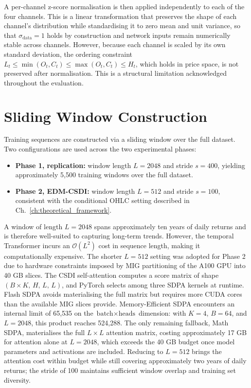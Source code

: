 A per-channel z-score normalisation is then applied independently to each of the four
channels. This is a linear transformation that preserves the shape of each channel's
distribution while standardising it to zero mean and unit variance, so that
\(\sigma_{\text{data}} = 1\) holds by construction and network inputs remain numerically
stable across channels. However, because each channel is scaled by its own standard
deviation, the ordering constraint \(L_t \leq \min(O_t, C_t) \leq \max(O_t, C_t) \leq H_t\),
which holds in price space, is not preserved after normalisation. This is a structural
limitation acknowledged throughout the evaluation.

\section{Sliding Window Construction}

Training sequences are constructed via a sliding window over the full dataset. Two
configurations are used across the two experimental phases:
\begin{itemize}
    \item \textbf{Phase 1, replication:} window length \(L = 2048\) and stride \(s = 400\),
    yielding approximately 5,500 training windows over the full dataset.
    \item \textbf{Phase 2, EDM-CSDI:} window length \(L = 512\) and stride \(s = 100\),
    consistent with the conditional OHLC setting described in
    Ch.~\ref{ch:theoretical_framework}.
\end{itemize}

A window of length \(L = 2048\) spans approximately ten years of daily returns and is
therefore well-suited to capturing long-term trends. However, the temporal Transformer
incurs an \(\mathcal{O}(L^2)\) cost in sequence length, making it computationally
expensive. The shorter \(L = 512\) setting was adopted for Phase 2 due to hardware
constraints imposed by MIG partitioning of the A100 GPU into 40 GB slices. The CSDI
self-attention computes a score matrix of shape \((B \times K,\, H,\, L,\, L)\), and
PyTorch selects among three SDPA kernels at runtime. Flash SDPA avoids materialising
the full matrix but requires more CUDA cores than the available MIG slices provide.
Memory-Efficient SDPA encounters an internal limit of 65,535 on the
\(\text{batch} \times \text{heads}\) dimension: with \(K = 4\), \(B = 64\), and
\(L = 2048\), this product reaches 524,288. The only remaining fallback, Math SDPA,
materialises the full \(L \times L\) attention matrix, costing approximately 17 GB for
attention alone at \(L = 2048\), which exceeds the 40 GB budget once model parameters
and activations are included. Reducing to \(L = 512\) brings the attention cost within
budget while still covering approximately two years of daily returns; the stride of 100
maintains sufficient window overlap and training set diversity.\\

